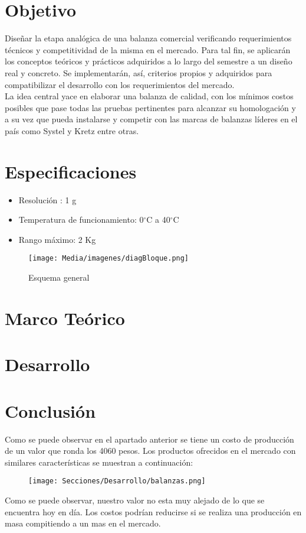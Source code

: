 \documentclass[12pt,A4]{article}
\begin{document}

\newpage
\tableofcontents
\newpage
\justifying
\section{Objetivo}

Diseñar la etapa analógica de una balanza comercial verificando requerimientos técnicos y competitividad de la misma en el mercado. Para tal fin, se aplicarán los conceptos teóricos y prácticos adquiridos a lo largo del semestre a un diseño real y concreto. Se implementarán, así, criterios propios y adquiridos para compatibilizar el desarrollo con los requerimientos del mercado.
\\La idea central yace en elaborar una balanza de calidad, con los mínimos costos posibles que pase todas las pruebas pertinentes para alcanzar su homologación y a su vez que pueda instalarse y competir con las marcas de balanzas líderes en el país como Systel y Kretz entre otras.
\section{Especificaciones}
\begin{itemize}
    \item Resolución : 1 g
    \item Temperatura de funcionamiento: 0$^\circ$C a 40$^\circ$C
    \item Rango máximo: 2 Kg
\end{itemize}
\begin{figure}[H]
    \centering
    \texttt{[image: Media/imagenes/diagBloque.png]}
    \caption{Esquema general}
    \label{fig:esqGeneral}
\end{figure}
\section{Marco Teórico}

\section{Desarrollo}

\section{Conclusión}
Como se puede observar en el apartado anterior se tiene un costo de producción de un valor
que ronda los 4060 pesos.
Los productos ofrecidos en el mercado con similares características se muestran a
continuación:
\begin{figure}[H]
    \centering
    \texttt{[image: Secciones/Desarrollo/balanzas.png]}
    \caption{}
    \label{fig:balanzas}
\end{figure}
\newpage
Como se puede observar, nuestro valor no esta muy alejado de lo que se encuentra hoy en día. Los costos podrían reducirse si se realiza una producción en masa compitiendo a un mas en el mercado.
\end{document}

